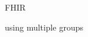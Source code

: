 



FHIR \citep{braunstein2022health}

using multiple groups \citep{saripalle2019representing}





